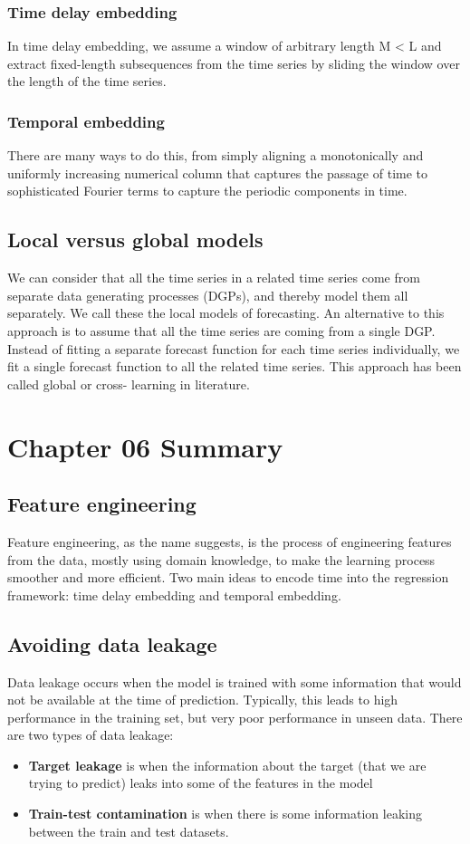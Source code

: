 \documentclass{article}
\begin{document}
\subsubsection{Time delay embedding}
In time delay embedding, we assume a window of arbitrary length M < L and extract fixed-length subsequences from the time series by sliding the window over the length of the time series.
\subsubsection{Temporal embedding}
There are many ways to do this, from simply aligning a monotonically and uniformly increasing numerical column that captures the passage of time to sophisticated Fourier terms to capture the periodic components in time. 

\subsection{Local versus global models}
We can consider that all the time series in a related time series come from separate data generating processes (DGPs), and thereby model them all separately. We call these the local models of forecasting. An alternative to this approach is to assume that all the time series are coming from a single DGP. Instead of fitting a separate forecast function for each time series individually, we fit a single forecast function to all the related time series. This approach has been called global or cross- learning in literature.

\section{Chapter 06 Summary}

\subsection{Feature engineering}
Feature engineering, as the name suggests, is the process of engineering features from the data, mostly using domain knowledge, to make the learning process smoother and more efficient. 
Two main ideas to encode time into the regression framework: time delay embedding and temporal embedding.
\subsection{Avoiding data leakage}
Data leakage occurs when the model is trained with some information that would not be available at the time of prediction. Typically, this leads to high performance in the training set, but very poor performance in unseen data. There are two types of data leakage:
\begin{itemize}
    \item \textbf{Target leakage} is when the information about the target (that we are trying to predict) leaks into some of the features in the model
    \item \textbf{Train-test contamination} is when there is some information leaking between the train and test datasets.
\end{itemize}
\end{document}
